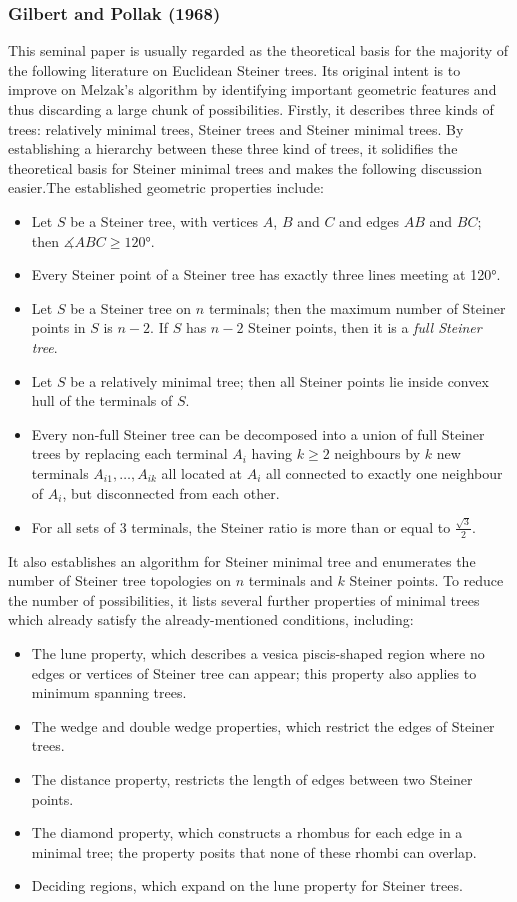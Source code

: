 \documentclass{mpaper}
\begin{document}
\subsubsection{Gilbert and Pollak (1968) \cite{GP1968}}
This seminal paper is usually regarded as the theoretical basis for the majority of the following literature on Euclidean Steiner trees. Its original intent is to improve on Melzak's algorithm by identifying important geometric features and thus discarding a large chunk of possibilities. Firstly, it describes three kinds of trees: relatively minimal trees, Steiner trees and Steiner minimal trees. By establishing a hierarchy between these three kind of trees, it solidifies the theoretical basis for Steiner minimal trees and makes the following discussion easier.The established geometric properties include:
\begin{itemize}
\item Let $S$ be a Steiner tree, with vertices $A$, $B$ and $C$ and edges $AB$ and $BC$; then $\measuredangle ABC\geq120°$.
\item Every Steiner point of a Steiner tree has exactly three lines meeting at 120°.
\item Let $S$ be a Steiner tree on $n$ terminals; then the maximum number of Steiner points in $S$ is $n-2$. If $S$ has $n-2$ Steiner points, then it is a \emph{full Steiner tree}.
\item Let $S$ be a relatively minimal tree; then all Steiner points lie inside convex hull of the terminals of $S$.
\item Every non-full Steiner tree can be decomposed into a union of full Steiner trees by replacing each terminal $A_i$ having $k\geq 2$ neighbours by $k$ new terminals $A_{i1},\dots,A_{ik}$ all located at $A_i$ all connected to exactly one neighbour of $A_i$, but disconnected from each other.
\item For all sets of 3 terminals, the Steiner ratio is more than or equal to $\frac{\sqrt{3}}{2}$.
\end{itemize}

It also establishes an algorithm for Steiner minimal tree and enumerates the number of Steiner tree topologies on $n$ terminals and $k$ Steiner points. To reduce the number of possibilities, it lists several further properties of minimal trees which already satisfy the already-mentioned conditions, including:
\begin{itemize}
\item The lune property, which describes a vesica piscis-shaped region where no edges or vertices of Steiner tree can appear; this property also applies to minimum spanning trees.
\item The wedge and double wedge properties, which restrict the edges of Steiner trees.
\item The distance property, restricts the length of edges between two Steiner points.
\item The diamond property, which constructs a rhombus for each edge in a minimal tree; the property posits that none of these rhombi can overlap.
\item Deciding regions, which expand on the lune property for Steiner trees.
\end{itemize}
\end{document}
